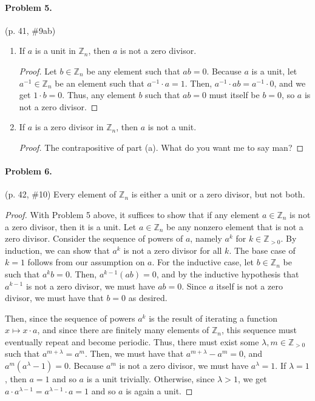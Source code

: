 \documentclass[12pt]{article}
\begin{document}
\paragraph{Problem 5.} (p. 41, \#9ab)
\begin{enumerate}
\item[a] If $a$ is a unit in $\mathbb Z_n$, then $a$ is not a zero divisor. \begin{proof}
    Let $b \in \mathbb Z_n$ be any element such that $ab = 0$. Because $a$ is a unit, let $a^{-1} \in \mathbb Z_n$ be an element such that $a^{-1} \cdot a = 1$. Then, $a^{-1}\cdot ab = a^{-1}\cdot 0$, and we get $1\cdot b = 0$. Thus, any element $b$ such that $ab = 0$ must itself be $b = 0$, so $a$ is not a zero divisor.
\end{proof}
\item[b] If $a$ is a zero divisor in $\mathbb Z_n$, then $a$ is not a unit. \begin{proof}
    The contrapositive of part (a). What do you want me to say man?
\end{proof}
\end{enumerate}

\paragraph{Problem 6.} (p. 42, \#10) Every element of $\mathbb Z_n$ is either a unit or a zero divisor, but not both.
\begin{proof}
    With Problem 5 above, it suffices to show that if any element $a \in \mathbb Z_n$ is not a zero divisor, then it is a unit. Let $a \in \mathbb Z_n$ be any nonzero element that is not a zero divisor.
    Consider the sequence of powers of $a$, namely $a^k$ for $k \in \mathbb Z_{> 0}$. By induction, we can show that $a^k$ is not a zero divisor for all $k$. The base case of $k = 1$ follows from our assumption on $a$. For the inductive case, let $b \in \mathbb Z_n$ be such that $a^k b = 0$. Then, $a^{k-1} (a b) = 0$, and by the inductive hypothesis that $a^{k-1}$ is not a zero divisor, we must have $ab = 0$. Since $a$ itself is not a zero divisor, we must have that $b = 0$ as desired.
    
    Then, since the sequence of powers $a^k$ is the result of iterating a function $x \mapsto x \cdot a$, and since there are finitely many elements of $\mathbb Z_n$, this sequence must eventually repeat and become periodic. Thus, there must exist some $\lambda, m \in \mathbb Z_{> 0}$ such that $a^{m+\lambda} = a^m$. Then, we must have that $a^{m+\lambda} - a^m = 0$, and $a^m(a^\lambda - 1) = 0$. Because $a^m$ is not a zero divisor, we must have $a^\lambda = 1$. If $\lambda = 1$, then $a = 1$ and so $a$ is a unit trivially. Otherwise, since $\lambda > 1$, we get $a \cdot a^{\lambda - 1} = a^{\lambda - 1} \cdot a = 1$ and so $a$ is again a unit.
\end{proof}
\end{document}
